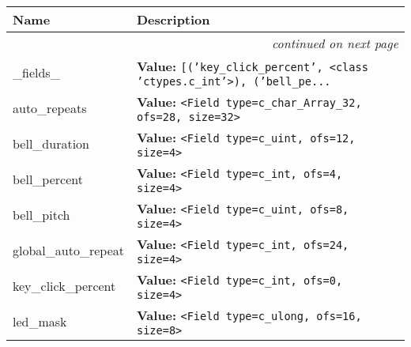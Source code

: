     \vspace{-1cm}
\hspace{\varindent}\begin{longtable}{|p{\varnamewidth}|p{\vardescrwidth}|l}
\cline{1-2}
\cline{1-2} \centering \textbf{Name} & \centering \textbf{Description}& \\
\cline{1-2}
\endhead\cline{1-2}\multicolumn{3}{r}{\small\textit{continued on next page}}\\\endfoot\cline{1-2}
\endlastfoot\raggedright \_\-f\-i\-e\-l\-d\-s\-\_\- & \raggedright \textbf{Value:} 
{\tt \texttt{[}\texttt{(}\texttt{'}\texttt{key\_click\_percent}\texttt{'}\texttt{, }{\textless}class 'ctypes.c\_int'{\textgreater}\texttt{)}\texttt{, }\texttt{(}\texttt{'}\texttt{bell\_pe}\texttt{...}}&\\
\cline{1-2}
\raggedright a\-u\-t\-o\-\_\-r\-e\-p\-e\-a\-t\-s\- & \raggedright \textbf{Value:} 
{\tt {\textless}Field type=c\_char\_Array\_32, ofs=28, size=32{\textgreater}}&\\
\cline{1-2}
\raggedright b\-e\-l\-l\-\_\-d\-u\-r\-a\-t\-i\-o\-n\- & \raggedright \textbf{Value:} 
{\tt {\textless}Field type=c\_uint, ofs=12, size=4{\textgreater}}&\\
\cline{1-2}
\raggedright b\-e\-l\-l\-\_\-p\-e\-r\-c\-e\-n\-t\- & \raggedright \textbf{Value:} 
{\tt {\textless}Field type=c\_int, ofs=4, size=4{\textgreater}}&\\
\cline{1-2}
\raggedright b\-e\-l\-l\-\_\-p\-i\-t\-c\-h\- & \raggedright \textbf{Value:} 
{\tt {\textless}Field type=c\_uint, ofs=8, size=4{\textgreater}}&\\
\cline{1-2}
\raggedright g\-l\-o\-b\-a\-l\-\_\-a\-u\-t\-o\-\_\-r\-e\-p\-e\-a\-t\- & \raggedright \textbf{Value:} 
{\tt {\textless}Field type=c\_int, ofs=24, size=4{\textgreater}}&\\
\cline{1-2}
\raggedright k\-e\-y\-\_\-c\-l\-i\-c\-k\-\_\-p\-e\-r\-c\-e\-n\-t\- & \raggedright \textbf{Value:} 
{\tt {\textless}Field type=c\_int, ofs=0, size=4{\textgreater}}&\\
\cline{1-2}
\raggedright l\-e\-d\-\_\-m\-a\-s\-k\- & \raggedright \textbf{Value:} 
{\tt {\textless}Field type=c\_ulong, ofs=16, size=8{\textgreater}}&\\
\cline{1-2}
\end{longtable}



